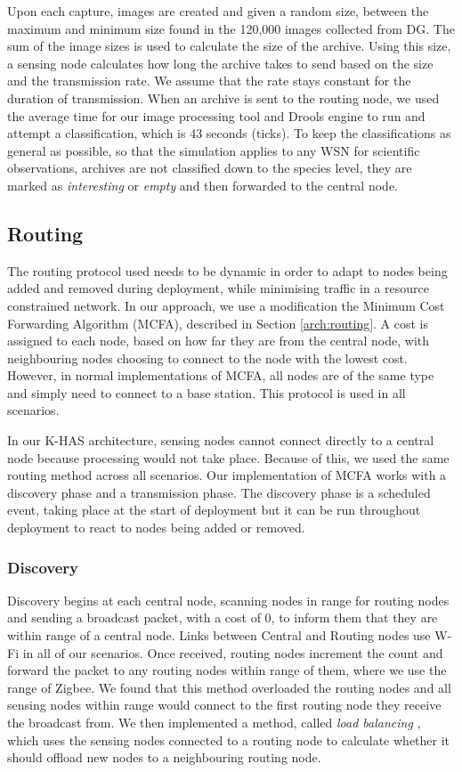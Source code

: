 Upon each capture, images are created and given a random size, between the maximum and minimum size found in the 120,000 images collected from DG. The sum of the image sizes is used to calculate the size of the archive. Using this size, a sensing node calculates how long the archive takes to send based on the size and the transmission rate. We assume that the rate stays constant for the duration of transmission.
When an archive is sent to the routing node, we used the average time for our image processing tool and Drools engine to run and attempt a classification, which is 43 seconds (ticks). To keep the classifications as general as possible, so that the simulation applies to any WSN for scientific observations, archives are not classified down to the species level, they are marked as \textit{interesting} or \textit{empty} and then forwarded to the central node.

\subsection{Routing}
The routing protocol used needs to be dynamic in order to adapt to nodes being added and removed during deployment, while minimising traffic in a resource constrained network. In our approach, we use a modification the Minimum Cost Forwarding Algorithm (MCFA), described in Section \ref{arch:routing}. A cost is assigned to each node, based on how far they are from the central node, with neighbouring nodes choosing to connect to the node with the lowest cost. However, in normal implementations of MCFA, all nodes are of the same type and simply need to connect to a base station. This protocol is used in all scenarios.

In our K-HAS architecture, sensing nodes cannot connect directly to a central node because processing would not take place. Because of this, we used the same routing method across all scenarios. Our implementation of MCFA works with a discovery phase and a transmission phase. The discovery phase is a scheduled event, taking place at the start of deployment but it can be run throughout deployment to react to nodes being added or removed. 

\subsubsection{Discovery}
	Discovery begins at each central node, scanning nodes in range for routing nodes and sending a broadcast packet, with a cost of 0, to inform them that they are within range of a central node. Links between Central and Routing nodes use W-Fi in all of our scenarios. Once received, routing nodes increment the count and forward the packet to any routing nodes within range of them, where we use the range of Zigbee. We found that this method overloaded the routing nodes and all sensing nodes within range would connect to the first routing node they receive the broadcast from. We then implemented a method, called \textit{load balancing} \cite{Gupta2003}, which uses the sensing nodes connected to a routing node to calculate whether it should offload new nodes to a neighbouring routing node.
	
